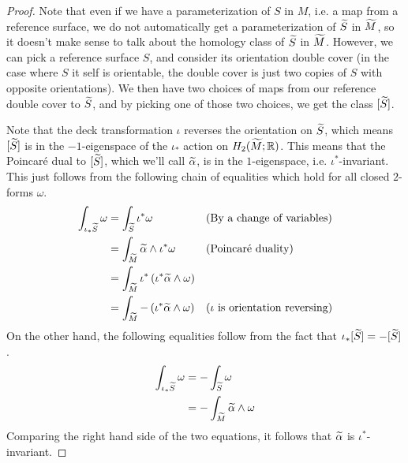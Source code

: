 \begin{proof}
  Note that even if we have a parameterization of $S$ in $M$, i.e. a map from a reference surface,
  we do not automatically get a parameterization of $\widetilde{S}$ in $\widetilde{M}$, so it doesn't make sense
  to talk about the homology class of $\widetilde{S}$ in $\widetilde{M}$. However, we can pick a reference
  surface $S$, and consider its orientation double cover (in the case where $S$ it self is
  orientable, the double cover is just two copies of $S$ with opposite orientations). We then
  have two choices of maps from our reference double cover to $\widetilde{S}$, and by picking one of
  those two choices, we get the class $[\widetilde{S}]$.

  Note that the deck transformation $\iota$ reverses the orientation on $\widetilde{S}$, which means
  $[\widetilde{S}]$ is in the $-1$-eigenspace of the $\iota_{\ast}$ action on $H_2(\widetilde{M}; \mathbb{R})$. This
  means that the Poincar\'e dual to $[\widetilde{S}]$, which we'll call $\widetilde{\alpha}$, is in the
  $1$-eigenspace, i.e. $\iota^{\ast}$-invariant. This just follows from the following
  chain of equalities which hold for all closed $2$-forms $\omega$.
  \begin{align*}
    \int_{\iota_{\ast}\widetilde{S}} \omega &= \int_{\widetilde{S}} \iota^{\ast}\omega &&\text{(By a change of variables)} \\
                                     &= \int_{\widetilde{M}} \widetilde{\alpha} \wedge \iota^{\ast} \omega &&\text{(Poincar\'e duality)} \\
                                     &=\int_{\widetilde{M}} \iota^{\ast} \left( \iota^{\ast}\widetilde{\alpha} \wedge \omega \right) \\
    &= \int_{\widetilde{M}} - \left( \iota^{\ast} \widetilde{\alpha} \wedge \omega \right) &&\text{($\iota$ is orientation reversing)}
  \end{align*}
  On the other hand, the following equalities follow from the fact that
  $\iota_{\ast}[\widetilde{S}] = -[\widetilde{S}]$.
  \begin{align*}
    \int_{\iota_{\ast}\widetilde{S}} \omega &= - \int_{\widetilde{S}} \omega \\
                              &= - \int_{\widetilde{M}} \widetilde{\alpha} \wedge \omega
  \end{align*}
  Comparing the right hand side of the two equations, it follows that $\widetilde{\alpha}$ is
  $\iota^{\ast}$-invariant.
\end{proof}

